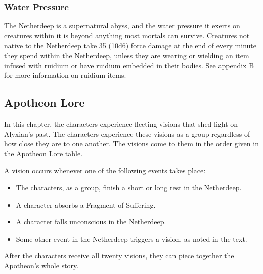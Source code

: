 \documentclass[10pt,a4paper,twoside,fancy,bg=print,twocolumn,openany,nodeprecatedcode]{dndbook}
\begin{document}
\subsubsection{Water Pressure}
The Netherdeep is a supernatural abyss, and the water pressure it exerts on creatures within it is beyond anything most mortals can survive. Creatures not native to the Netherdeep take 35 (10d6) force damage at the end of every minute they spend within the Netherdeep, unless they are wearing or wielding an item infused with ruidium or have ruidium embedded in their bodies. See appendix B for more information on ruidium items.

\subsection{Apotheon Lore}
In this chapter, the characters experience fleeting visions that shed light on Alyxian's past. The characters experience these visions as a group regardless of how close they are to one another. The visions come to them in the order given in the Apotheon Lore table.

A vision occurs whenever one of the following events takes place:


\begin{itemize}
\item The characters, as a group, finish a short or long rest in the Netherdeep.
\item A character absorbs a Fragment of Suffering.
\item A character falls unconscious in the Netherdeep.
\item Some other event in the Netherdeep triggers a vision, as noted in the text.
\end{itemize}

After the characters receive all twenty visions, they can piece together the Apotheon's whole story.
\end{document}
